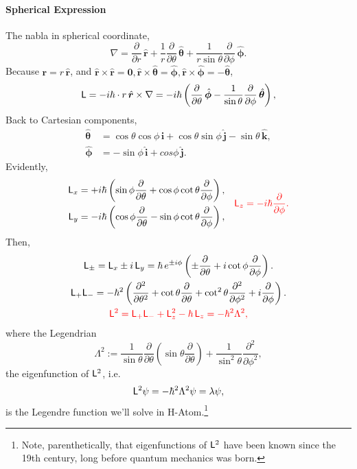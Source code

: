 \documentclass{article}
\newcommand{\pd}[2]{\frac{\partial #1}{\partial #2}}%
\newcommand{\spd}[2]{\frac{\partial^2 #1}{\partial #2^2}}
\newcommand{\kh}[1]{\left(#1\right)}
\newcommand{\ubm}[1]{\hat{\bm #1}}%
\newcommand{\ibm}[1]{\,\hat{\bm #1}}%
\newcommand{\spark}[1]{\textcolor{red}{#1}}
\begin{document}
\paragraph{Spherical Expression}The nabla in spherical coordinate,
$$\nabla=\pd{}r\ibm r+\frac1r\pd{}\theta\ibm\theta+\frac1{r\sin\theta}\pd{}\phi\ibm\phi.$$
Because $\bm r=r\ibm r$, and $\hat{\bm r}\times\hat{\bm r}=\bm 0,\hat{\bm r}\times\hat{\bm\theta}=\hat{\bm\phi},\hat{\bm r}\times\hat{\bm\phi}=-\hat{\bm\theta}$,
$$\sL=-i\hbar\cdot r\ibm r\times\nabla=-i\hbar\kh{\pd{}\theta\ibm\phi-\frac1{\sin\theta}\pd{}\phi\ibm\theta},$$
Back to Cartesian components,
\begin{align*}
	\ubm\theta & =\cos\theta\cos\phi\ibm i+\cos\theta\sin\phi\ibm j-\sin\theta\ibm k, \\
	\ubm\phi   & =-\sin\phi\ibm i+cos\phi\ibm j.
\end{align*}
Evidently,
\begin{align*}
	\begin{aligned}
		\sL_x & =+i\hbar\kh{\sin\phi\pd{}\theta+\cos\phi\cot\theta\pd{}\phi}, \\
		\sL_y & =-i\hbar\kh{\cos\phi\pd{}\theta-\sin\phi\cot\theta\pd{}\phi},
	\end{aligned}\quad
	\spark{\sL_z=-i\hbar\pd{}\phi.}
\end{align*}
Then,
\begin{gather*}
	\sL_\pm=\sL_x\pm i\,\sL_y=\hbar\,e^{\pm i\phi}\kh{\pm\pd{}\theta+i\cot\phi\pd{}\phi}.\\
	\sL_+\sL_-=-\hbar^2\kh{\spd{}\theta+\cot\theta\pd{}\theta+\cot^2\theta\spd{}\phi+i\pd{}\phi}.\\
	\spark{\sL^2=\sL_+\sL_-+\sL_z^2-\hbar\,\sL_z=-\hbar^2\Lambda^2,}
\end{gather*}
where the Legendrian
$$\Lambda^2:=\frac1{\sin\theta}\pd{}\theta\left(\sin\theta\pd{}\theta\right)+\frac1{\sin^2\theta}\spd{}\phi,$$
the eigenfunction of $\mathsf L^2$, i.e.
$$\mathsf L^2\psi=-\hbar^2\Lambda^2\psi=\lambda\psi,$$
\setcounter{footnote}{0}
is the Legendre function we'll solve in H-Atom.\footnote{Note, parenthetically, that eigenfunctions of $\mathsf L^2$ have been known since the 19th century, long before quantum mechanics was born.}\clearpage
\end{document}
